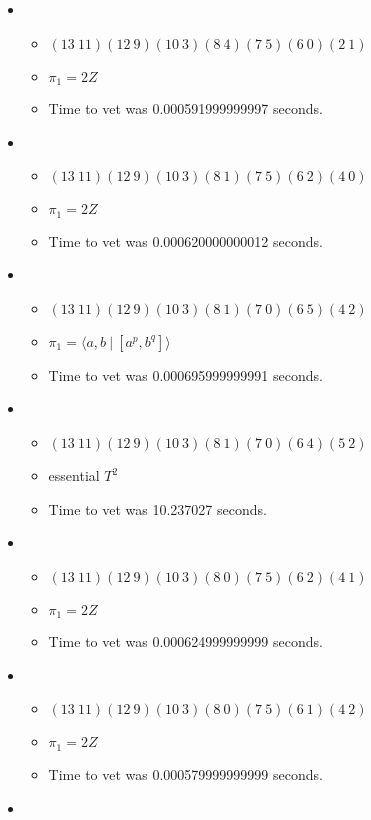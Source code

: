 \documentclass{article}
\begin{document}
\begin{itemize}
\begin{itemize}
\end{itemize}
\item \begin{itemize}
      \item $(13\ 11)(12\ 9)(10\ 3)(8\ 4)(7\ 5)(6\ 0)(2\ 1)$
      \item $\pi_1 =2 Z$
      \item Time to vet was 0.000591999999997 seconds.
\end{itemize}
\item \begin{itemize}
      \item $(13\ 11)(12\ 9)(10\ 3)(8\ 1)(7\ 5)(6\ 2)(4\ 0)$
      \item $\pi_1 =2 Z$
      \item Time to vet was 0.000620000000012 seconds.
\end{itemize}
\item \begin{itemize}
      \item $(13\ 11)(12\ 9)(10\ 3)(8\ 1)(7\ 0)(6\ 5)(4\ 2)$
      \item $\pi_1 = \langle a,b\ |\ [a^p,b^q]\rangle$
      \item Time to vet was 0.000695999999991 seconds.
\end{itemize}
\item \begin{itemize}
      \item $(13\ 11)(12\ 9)(10\ 3)(8\ 1)(7\ 0)(6\ 4)(5\ 2)$
      \item essential $T^2$
      \item Time to vet was 10.237027 seconds.
\end{itemize}
\item \begin{itemize}
      \item $(13\ 11)(12\ 9)(10\ 3)(8\ 0)(7\ 5)(6\ 2)(4\ 1)$
      \item $\pi_1 =2 Z$
      \item Time to vet was 0.000624999999999 seconds.
\end{itemize}
\item \begin{itemize}
      \item $(13\ 11)(12\ 9)(10\ 3)(8\ 0)(7\ 5)(6\ 1)(4\ 2)$
      \item $\pi_1 =2 Z$
      \item Time to vet was 0.000579999999999 seconds.
\end{itemize}
\item \begin{itemize}

\end{itemize}
\end{itemize}
\end{document}

